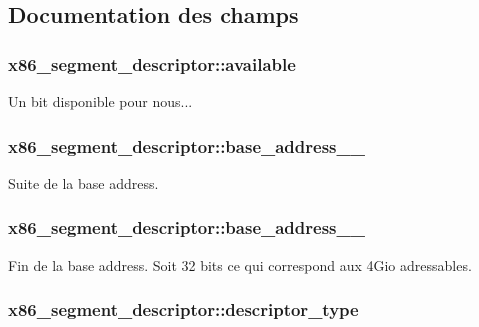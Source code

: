 \subsection{Documentation des champs}
\hypertarget{structx86__segment__descriptor_a761494a7a460e493e0d5d188a31cd052}{
\subsubsection[{available}]{ x86\-\_\-segment\-\_\-descriptor\-::available}}\label{structx86__segment__descriptor_a761494a7a460e493e0d5d188a31cd052}
Un bit disponible pour nous... \hypertarget{structx86__segment__descriptor_a95889fcbabf116ba15a6cea3364b903d}{
\subsubsection[{base\-\_\-address\-\_\-23\-\_\-16}]{ x86\-\_\-segment\-\_\-descriptor\-::base\-\_\-address\-\_\-\_}}\label{structx86__segment__descriptor_a95889fcbabf116ba15a6cea3364b903d}
Suite de la base address. \hypertarget{structx86__segment__descriptor_af839dd21992c16573ea5b816b72f249f}{
\subsubsection[{base\-\_\-address\-\_\-31\-\_\-24}]{ x86\-\_\-segment\-\_\-descriptor\-::base\-\_\-address\-\_\-\_}}\label{structx86__segment__descriptor_af839dd21992c16573ea5b816b72f249f}
Fin de la base address. Soit 32 bits ce qui correspond aux 4\-Gio adressables. \hypertarget{structx86__segment__descriptor_adda0434239b7e6c6a68b8e7556e4bb2f}{
\subsubsection[{descriptor\-\_\-type}]{ x86\-\_\-segment\-\_\-descriptor\-::descriptor\-\_\-type}}\label{structx86__segment__descriptor_adda0434239b7e6c6a68b8e7556e4bb2f}
